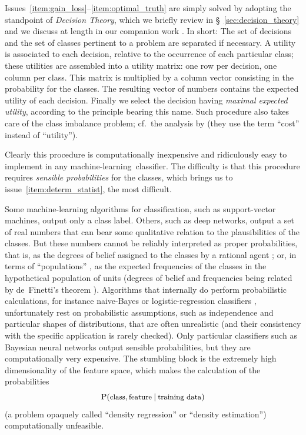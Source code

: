 \documentclass[\ifafour a4paper,12pt,\else a5paper,10pt,\fi%
onecolumn,oneside,article,%
british%
]{memoir}
\theoremstyle{remark}
\theoremstyle{innote}
\renewcommand*{\P}{\mathrm{P}}%
\renewcommand*{\|}[1][]{\nonscript\:#1\vert\nonscript\:\mathopen{}}
\newcommand*{\sect}{\S}%
\newcommand*{\sects}{\S\S}%
\newcommand*{\chap}{ch.}%
\newcommand*{\chaps}{chs}%
\newcommand*{\cf}{{cf.}}
\newcommand*{\ml}{machine-learning}
\newcommand*{\texts}[1]{\text{\small #1}}
\begin{document}
Issues~\ref{item:gain_loss}--\ref{item:optimal_truth} are simply solved by adopting the standpoint of \emph{Decision Theory}, which we briefly review in \sect~\ref{sec:decision_theory} and we discuss at length in our companion work \autocites{dyrlandetal2022}. In short: The set of decisions and the set of classes pertinent to a problem are separated if necessary. A utility is associated to each decision, relative to the occurrence of each particular class; these utilities are assembled into a utility matrix: one row per decision, one column per class. This matrix is multiplied by a column vector consisting in the probability for the classes. The resulting vector of numbers contains the expected utility of each decision. Finally we select the decision having \emph{maximal expected utility}, according to the principle bearing this name. Such procedure also takes care of the class imbalance problem; \cf\ the analysis by \cite{drummondetal2005} (they use the term \enquote{cost} instead of \enquote{utility}).

Clearly this procedure is computationally inexpensive and ridiculously easy to implement in any \ml\ classifier. The difficulty is that this procedure requires \emph{sensible probabilities} for the classes, which brings us to issue~\ref{item:determ_statist}, the most difficult.

Some machine-learning algorithms for classification, such as support-vector machines, output only a class label. Others, such as deep networks, output a set of real numbers that can bear some qualitative relation to the plausibilities of the classes. But these numbers cannot be reliably interpreted as proper probabilities, that is, as the degrees of belief assigned to the classes by a rational agent \autocites{mackay1992d,galetal2016}[\chaps~2, 12, 13]{russelletal1995_r2022}; or, in terms of \enquote{populations} \autocites{lindleyetal1981}[\sect~II.4]{fisher1956_r1967}, as the expected frequencies of the classes in the hypothetical population of units (degrees of belief and frequencies being related by de~Finetti's theorem \autocites[\chap~4]{bernardoetal1994_r2000}{dawid2013}). Algorithms that internally do perform probabilistic calculations, for instance naive-Bayes or logistic-regression classifiers \autocites[\sect~3.5, \chap~8]{murphy2012}[\sects~8.2, 4.3]{bishop2006}[\chap~10, \sect~17.4]{barber2007_r2020}, unfortunately rest on probabilistic assumptions, such as independence and particular shapes of distributions, that are often unrealistic (and their consistency with the specific application is rarely checked). Only particular classifiers such as Bayesian neural networks \autocites{nealetal2006}[\sect~5.7]{bishop2006} output sensible probabilities, but they are computationally very expensive. The stumbling block is the extremely high dimensionality of the feature space, which makes the calculation of the probabilities
\[
  \P(\texts{class}, \texts{feature} \| \texts{training data})
\]
(a problem opaquely called \enquote{density regression} or \enquote{density estimation}\autocites{ferguson1983,thorburn1986,hjort1996,dunsonetal2007}) computationally unfeasible.
\end{document}

